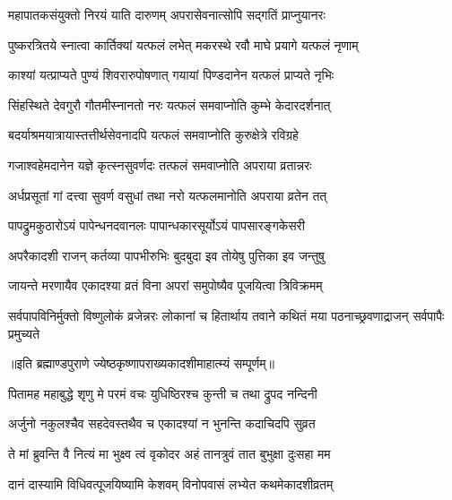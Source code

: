 \twolineshloka
{महापातकसंयुक्तो निरयं याति दारुणम्}
{अपरासेवनात्सोपि सद्गतिं प्राप्नुयानरः} %

\twolineshloka
{पुष्करत्रितये स्नात्वा कार्तिक्यां यत्फलं लभेत्}
{मकरस्थे रवौ माघे प्रयागे यत्फलं नृणाम्} %

\twolineshloka
{काश्यां यत्प्राप्यते पुण्यं शिवरारुपोषणात्}
{गयायां पिण्डदानेन यत्फलं प्राप्यते नृभिः} %

\twolineshloka
{सिंहस्थिते देवगुरौ गौतमीस्नानतो नरः}
{यत्फलं समवाप्नोति कुम्भे केदारदर्शनात्} %

\twolineshloka
{बदर्याश्रमयात्रायास्तत्तीर्थसेवनादपि}
{यत्फलं समवाप्नोति कुरुक्षेत्रे रविग्रहे} %

\twolineshloka
{गजाश्वहेमदानेन यज्ञे कृत्स्नसुवर्णदः}
{तत्फलं समवाप्नोति अपराया व्रतान्नरः} %

\twolineshloka
{अर्धप्रसूतां गां दत्त्वा सुवर्ण वसुधां तथा}
{नरो यत्फलमानोति अपराया व्रतेन तत्} %

\twolineshloka
{पापद्रुमकुठारोऽयं पापेन्धनदवानलः}
{पापान्धकारसूर्योऽयं पापसारङ्गकेसरी} %

\twolineshloka
{अपरैकादशी राजन् कर्तव्या पापभीरुभिः}
{बुदबुदा इव तोयेषु पुत्तिका इव जन्तुषु} %

\twolineshloka
{जायन्ते मरणायैव एकादश्या व्रतं विना}
{अपरां समुपोष्यैव पूजयित्वा त्रिविक्रमम्} %


\threelineshloka
{सर्वपापविनिर्मुक्तो विष्णुलोकं व्रजेन्नरः}
{लोकानां च हितार्थाय तवाने कथितं मया}
{पठनाच्छ्रवणाद्राजन् सर्वपापैः प्रमुच्यते} %

॥इति ब्रह्माण्डपुराणे ज्येष्ठकृष्णापराख्यकादशीमाहात्म्यं सम्पूर्णम्॥


\hyperref[sec:ekadashi_mahatmyam_vrata_raja]{\closesub}
\clearpage

\label{sec:vrata-raja-jyeshtha-shukla-nirjala}


\twolineshloka
{पितामह महाबुद्धे शृणु मे परमं वचः}
{युधिष्ठिरश्च कुन्ती च तथा द्रुपद नन्दिनी} %

\twolineshloka
{अर्जुनो नकुलश्चैव सहदेवस्तथैव च}
{एकादश्यां न भुनन्ति कदाचिदपि सुव्रत} %

\twolineshloka
{ते मां ब्रुवन्ति वै नित्यं मा भुक्ष्व त्वं वृकोदर}
{अहं तानत्रुवं तात बुभुक्षा दुःसहा मम} %

\twolineshloka
{दानं दास्यामि विधिवत्पूजयिष्यामि केशवम्}
{विनोपवासं लभ्येत कथमेकादशीव्रतम्} %


